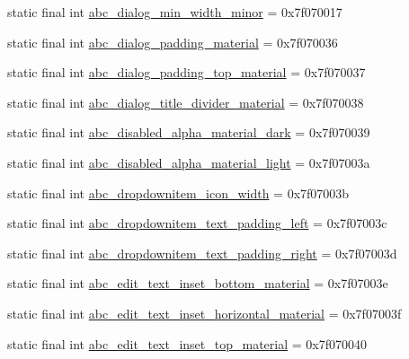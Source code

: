 \begin{CompactItemize}
\item 
static final int \hyperlink{classandroid_1_1support_1_1v4_1_1_r_1_1dimen_6cc316ff66e9cd32c39ed60f79572bd2}{abc\_\-dialog\_\-min\_\-width\_\-minor} = 0x7f070017
\item 
static final int \hyperlink{classandroid_1_1support_1_1v4_1_1_r_1_1dimen_ada957ef50c06048be65f75ab732a469}{abc\_\-dialog\_\-padding\_\-material} = 0x7f070036
\item 
static final int \hyperlink{classandroid_1_1support_1_1v4_1_1_r_1_1dimen_2398dadfe4c578448662e9cb7d54b581}{abc\_\-dialog\_\-padding\_\-top\_\-material} = 0x7f070037
\item 
static final int \hyperlink{classandroid_1_1support_1_1v4_1_1_r_1_1dimen_6138b2b9b8a179c22cf15dec20f8a100}{abc\_\-dialog\_\-title\_\-divider\_\-material} = 0x7f070038
\item 
static final int \hyperlink{classandroid_1_1support_1_1v4_1_1_r_1_1dimen_f0b615b8848c5aeb92663fe979bb29e4}{abc\_\-disabled\_\-alpha\_\-material\_\-dark} = 0x7f070039
\item 
static final int \hyperlink{classandroid_1_1support_1_1v4_1_1_r_1_1dimen_8d057ab90edc3de292a01c25669c31f4}{abc\_\-disabled\_\-alpha\_\-material\_\-light} = 0x7f07003a
\item 
static final int \hyperlink{classandroid_1_1support_1_1v4_1_1_r_1_1dimen_a9a25cc366d63d9857c55af49d793856}{abc\_\-dropdownitem\_\-icon\_\-width} = 0x7f07003b
\item 
static final int \hyperlink{classandroid_1_1support_1_1v4_1_1_r_1_1dimen_93bc10ca854948ee0c5f146537f7d780}{abc\_\-dropdownitem\_\-text\_\-padding\_\-left} = 0x7f07003c
\item 
static final int \hyperlink{classandroid_1_1support_1_1v4_1_1_r_1_1dimen_e1a4a44f12f129c2cd5637c3d8309521}{abc\_\-dropdownitem\_\-text\_\-padding\_\-right} = 0x7f07003d
\item 
static final int \hyperlink{classandroid_1_1support_1_1v4_1_1_r_1_1dimen_ca59bc10ff4a7755fadb0bf5f5a23aa0}{abc\_\-edit\_\-text\_\-inset\_\-bottom\_\-material} = 0x7f07003e
\item 
static final int \hyperlink{classandroid_1_1support_1_1v4_1_1_r_1_1dimen_16fcf2392b603d32b5af9807e46018a8}{abc\_\-edit\_\-text\_\-inset\_\-horizontal\_\-material} = 0x7f07003f
\item 
static final int \hyperlink{classandroid_1_1support_1_1v4_1_1_r_1_1dimen_00f9d36f5a0aa5982abbeeb6ecd4868d}{abc\_\-edit\_\-text\_\-inset\_\-top\_\-material} = 0x7f070040
\item 

\end{CompactItemize}
